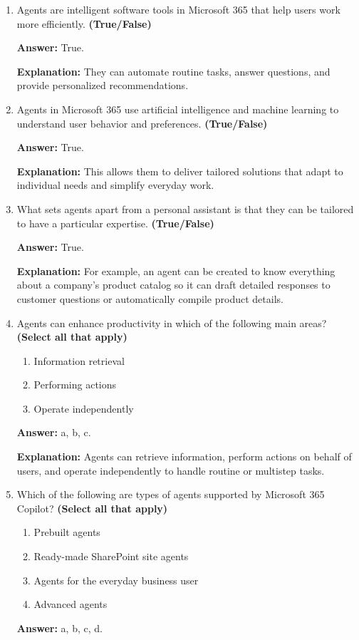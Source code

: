 \documentclass[10pt]{article}
\begin{document}
\begin{enumerate}[leftmargin=*]

\item Agents are intelligent software tools in Microsoft 365 that help users work more efficiently. \textbf{(True/False)}

\textbf{Answer:} True.

\textbf{Explanation:} They can automate routine tasks, answer questions, and provide personalized recommendations.

\item Agents in Microsoft 365 use artificial intelligence and machine learning to understand user behavior and preferences. \textbf{(True/False)}

\textbf{Answer:} True.

\textbf{Explanation:} This allows them to deliver tailored solutions that adapt to individual needs and simplify everyday work.

\item What sets agents apart from a personal assistant is that they can be tailored to have a particular expertise. \textbf{(True/False)}

\textbf{Answer:} True.

\textbf{Explanation:} For example, an agent can be created to know everything about a company’s product catalog so it can draft detailed responses to customer questions or automatically compile product details.

\item Agents can enhance productivity in which of the following main areas? \textbf{(Select all that apply)}
\begin{enumerate}[label=\alph*., leftmargin=1.5em]
\item Information retrieval
\item Performing actions
\item Operate independently
\end{enumerate}
\textbf{Answer:} a, b, c.

\textbf{Explanation:} Agents can retrieve information, perform actions on behalf of users, and operate independently to handle routine or multistep tasks.

\item Which of the following are types of agents supported by Microsoft 365 Copilot? \textbf{(Select all that apply)}
\begin{enumerate}[label=\alph*., leftmargin=1.5em]
\item Prebuilt agents
\item Ready-made SharePoint site agents
\item Agents for the everyday business user
\item Advanced agents
\end{enumerate}
\textbf{Answer:} a, b, c, d.


\end{enumerate}
\end{document}
